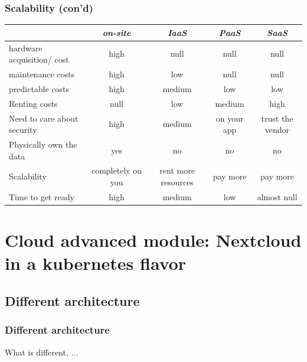 \documentclass{beamer}
\begin{document}
\begin{frame}
    \frametitle{Scalability (con'd)}
    \begin{center}
        \tiny
        \begin{tabular}{l|c c c c}
                                        & \textit{on-site} & \textit{IaaS} & \textit{PaaS} & \textit{SaaS} \\
            \hline
            hardware acquisition/ cost  & high              & null      & null          & null                  \\
            maintenance costs           & high              & low       & null          & null                  \\
            predictable costs           & high              & medium    & low           & low                   \\ 
            Renting costs               & null              & low       & medium        & high                  \\
            Need to care about security & high              & medium    & on your app   & trust the vendor      \\
            Physically own the data     & yes               & no        & no            & no                    \\
            Scalability                 & completely on you & rent more resources & pay more & pay more         \\
            Time to get ready           & high              & medium    & low           & almost null           \\
        \end{tabular}
    \end{center}
\end{frame}



\section{Cloud \textbf{advanced} module: Nextcloud in a kubernetes flavor}

\subsection{Different architecture}
\begin{frame}
    \frametitle{Different architecture}
    What is different, ...
\end{frame}
\end{document}
